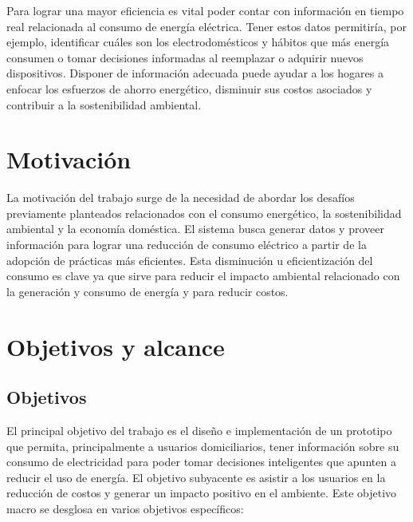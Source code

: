 Para lograr una mayor eficiencia es vital poder contar con información en tiempo real relacionada al consumo de energía eléctrica. Tener estos datos permitiría, por ejemplo, identificar cuáles son los electrodomésticos y hábitos que más energía consumen o tomar decisiones informadas al reemplazar o adquirir nuevos dispositivos. Disponer de información adecuada puede ayudar a los hogares a enfocar los esfuerzos de ahorro energético, disminuir sus costos asociados y contribuir a la sostenibilidad ambiental.

\newpage
\section{Motivación}
La motivación del trabajo surge de la necesidad de abordar los desafíos previamente planteados relacionados con el consumo energético, la sostenibilidad ambiental y la economía doméstica. El sistema busca generar datos y proveer información para lograr una reducción de consumo eléctrico a partir de la adopción de prácticas más eficientes. Esta disminución u eficientización del consumo es clave ya que sirve para reducir el impacto ambiental relacionado con la generación y consumo de energía y para reducir costos.

\newpage
\section{Objetivos y alcance}

\subsection{Objetivos}
El principal objetivo del trabajo es el diseño e implementación de un prototipo que permita, principalmente a usuarios domiciliarios, tener información sobre su consumo de electricidad para poder tomar decisiones inteligentes que apunten a reducir el uso de energía. El objetivo subyacente es asistir a los usuarios en la reducción de costos y generar un impacto positivo en el ambiente. Este objetivo macro se desglosa en varios objetivos específicos:

